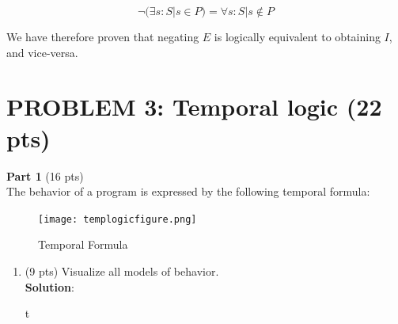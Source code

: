 \documentclass[12pt]{article}
\begin{document}
\begin{spacing}{1.5}
\begin{enumerate}
		      $$\neg (\exists s : S | s \in P) = \forall s : S | s \notin P$$
		      		      		      		      		      		      
		      We have therefore proven that negating $E$ is logically equivalent to obtaining $I$, and vice-versa.
		      		      		      		      		      		      
	\end{enumerate}
							    
						    
	\newpage
						    
	\section*{PROBLEM 3: Temporal logic (22 pts)}
						
	\textbf{Part 1} (16 pts)\\
						    
	The behavior of a program is expressed by the following temporal formula:
						
	\begin{figure}[htp]
		\centering
		\texttt{[image: templogicfigure.png]}
		\caption{Temporal Formula}
		\label{fig:figure}
	\end{figure}
						
						    
						
	\begin{enumerate}
		\item (9 pts) Visualize all models of behavior.\\
		      \textbf{Solution}:\\
		      \begin{center}
		      	t
		      			      			      			      			      			      	

\end{center}
\end{enumerate}
\end{spacing}
\end{document}
